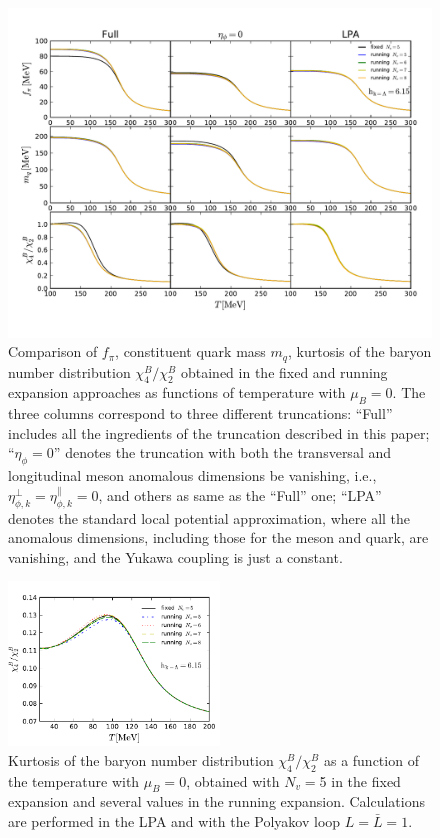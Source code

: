 \documentclass[%
reprint,
superscriptaddress,
showpacs,preprintnumbers,
 amsmath,amssymb,
 aps,
prd,
]{revtex4-1}
\begin{document}
%
\begin{figure}[t]
\includegraphics[width=1\textwidth]{trun-expan}
\caption{Comparison of $f_\pi$, constituent quark mass $m_q$, kurtosis of the baryon number distribution $\chi_4^{B}/\chi_2^{B}$ obtained in the fixed and running expansion approaches as functions of temperature with $\mu_B=0$. The three columns correspond to three different truncations: ``Full'' includes all the ingredients of the truncation described in this paper; ``$\eta_\phi=0$'' denotes the truncation with both the transversal and longitudinal meson anomalous dimensions be vanishing, i.e., $\eta_{\phi,k}^{\perp}=\eta_{\phi,k}^{\parallel}=0$, and others as same as the ``Full'' one; ``LPA'' denotes the standard local potential approximation, where all the anomalous dimensions, including those for the meson and quark, are vanishing, and the Yukawa coupling is just a constant.}\label{fig:trun-expan}
\end{figure}
%

%
\begin{figure}[t]
\includegraphics[width=0.5\textwidth]{R42QM-expan}
\caption{Kurtosis of the baryon number distribution $\chi_4^{B}/\chi_2^{B}$ as a function of the temperature with $\mu_B=0$, obtained with $N_v=$5 in the fixed expansion and several values in the running expansion. Calculations are performed in the LPA and with the Polyakov loop $L=\bar L=1$.}\label{fig:R42QM-expan}
\end{figure}
%
\end{document}
